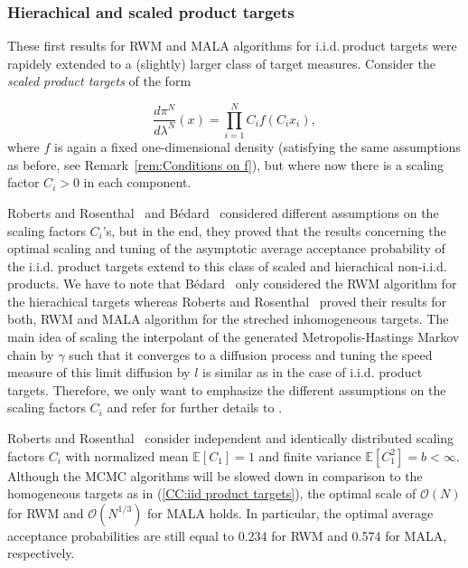 \subsubsection{Hierachical and scaled product targets} 

These first results for RWM and MALA algorithms for i.i.d.\,product targets were rapidely extended to a (slightly) larger class of target measures. Consider the  \textit{scaled product targets} of the form

\begin{equation}
 \label{CC:Scaled product targets}
 \frac{d \pi^{N}}{d \lambda^{N}}(x) = \prod_{i=1}^{N} C_i f(C_i x_i),
\end{equation}
where $f$ is again a fixed one-dimensional density (satisfying the same assumptions as before, see Remark~\ref{rem:Conditions on f}), but where now there is a scaling factor $C_i > 0$ in each component.

Roberts and Rosenthal~\autocite{Roberts2001} and B\'{e}dard~\autocite{Bedard2007} considered different assumptions on the scaling factors $ C_i $'s, but in the end, they proved that the results concerning the optimal scaling and tuning of the asymptotic average acceptance probability of the i.i.d. product targets extend to this class of scaled and hierachical non-i.i.d. products. We have to note that B\'{e}dard~\autocite{Bedard2007} only considered the RWM algorithm for the hierachical targets whereas Roberts and Rosenthal~\autocite{Roberts2001} proved their results for both, RWM and MALA algorithm for the streched inhomogeneous targets.
The main idea of scaling the interpolant of the generated Metropolis-Hastings Markov chain by $\gamma$ such that it converges to a diffusion process and tuning the speed measure of this limit diffusion by $l$ is similar as in the case of i.i.d. product targets. Therefore, we only want to emphasize the different assumptions on the scaling factors $C_i$ and refer for further details to \autocite{Bedard2007, Roberts2001}.


Roberts and Rosenthal~\autocite{Roberts2001} consider independent and identically distributed scaling factors $C_i$ with normalized mean $\mathbb{E}[C_1] = 1$ and finite variance $ \mathbb{E}[C_1^2] = b < \infty $. Although the MCMC algorithms will be slowed down in comparison to the homogeneous targets as in (\ref{CC:iid product targets}), the optimal scale of $\mathcal{O}(N)$ for RWM and $ \mathcal{O}(N^{1/3}) $ for MALA holds. In particular, the optimal average acceptance probabilities are still equal to 0.234 for RWM and 0.574 for MALA, respectively.


